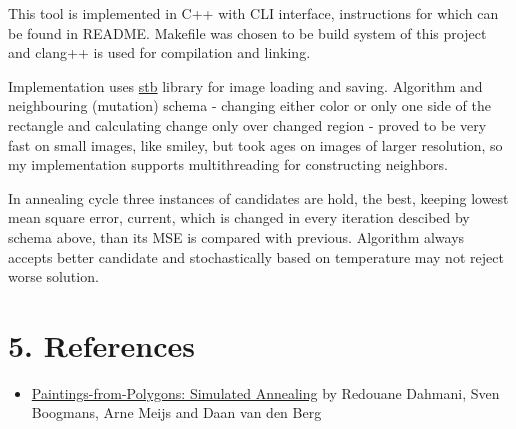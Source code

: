 \documentclass[a4paper,twocolumn]{article}
\begin{document}
This tool is implemented in C++ with CLI interface, instructions for which can be found in README. Makefile was chosen to be build system of this project and clang++ is used for compilation and linking.

Implementation uses \href{https://github.com/nothings/stb?tab=readme-ov-file}{stb} library for image loading and saving. Algorithm and neighbouring (mutation) schema - changing either color or only one side of the rectangle and calculating change only over changed region - proved to be very fast on small images, like smiley, but took ages on images of larger resolution, so my implementation supports multithreading for constructing neighbors.

In annealing cycle three instances of candidates are hold, the best, keeping lowest mean square error, current, which is changed in every iteration descibed by schema above, than its MSE is compared with previous. Algorithm always accepts better candidate and stochastically based on temperature may not reject worse solution.

\section*{5. References}

\begin{itemize}[leftmargin=1cm]
        \item \href{https://ceur-ws.org/Vol-2827/KBS-Paper\_2.pdf}{Paintings-from-Polygons: Simulated Annealing} by Redouane Dahmani, Sven Boogmans, Arne Meijs and Daan van den Berg
\end{itemize}
\end{document}
